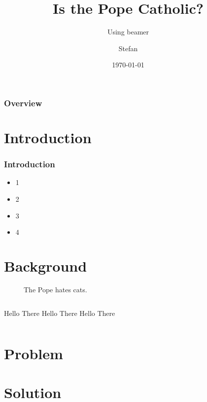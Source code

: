\documentclass{beamer}
\title{Is the Pope Catholic?}
\subtitle{Using beamer}
\author{Stefan}
\institute{University}
\date{\today}
\begin{document}
\begin{frame}
	\titlepage
\end{frame}

\begin{frame}
	\frametitle{Overview}
	\tableofcontents
\end{frame}


\section{Introduction}
\begin{frame}
	\frametitle{Introduction}
	\begin{itemize}
		\item 1
		\item 2
		\item 3
		\item 4

	\end{itemize}
\end{frame}


\section{Background}
\begin{frame}
	\begin{figure}
	The Pope hates cats.
	\end{figure}

\end{frame}
	\begin{frame}
		\begin{columns}
				Hello There
				Hello There
				Hello There

				
		\end{columns}
	\end{frame}


\section{Problem}
\begin{frame}
\end{frame}


\section{Solution}
\begin{frame}
\end{frame}
\end{document}
